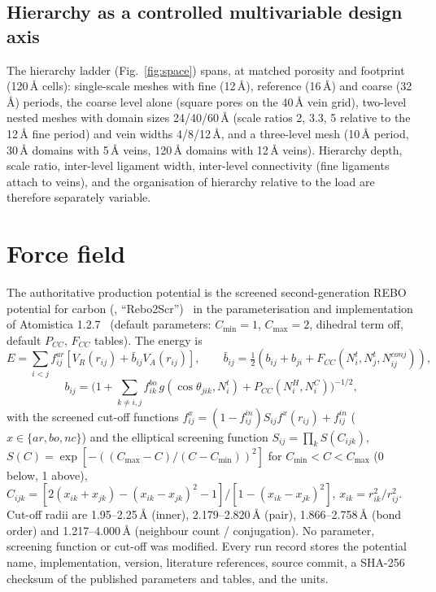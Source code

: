 \subsection{Hierarchy as a controlled multivariable design axis}
The hierarchy ladder (Fig.~\ref{fig:space}) spans, at matched porosity and footprint (120\,\AA{} cells): single-scale meshes with fine (12\,\AA), reference (16\,\AA) and coarse (32\,\AA) periods, the coarse level alone (square pores on the 40\,\AA{} vein grid), two-level nested meshes with domain sizes 24/40/60\,\AA{} (scale ratios 2, 3.3, 5 relative to the 12\,\AA{} fine period) and vein widths 4/8/12\,\AA, and a three-level mesh (10\,\AA{} period, 30\,\AA{} domains with 5\,\AA{} veins, 120\,\AA{} domains with 12\,\AA{} veins). Hierarchy depth, scale ratio, inter-level ligament width, inter-level connectivity (fine ligaments attach to veins), and the organisation of hierarchy relative to the load are therefore separately variable.

\section{Force field}
\label{sec:ff}
The authoritative production potential is the screened second-generation REBO potential for carbon (\rebo{}, ``Rebo2Scr'')~\cite{brenner2002,pastewka2008,pastewka2013} in the parameterisation and implementation of Atomistica 1.2.7~\cite{atomistica} (default parameters: $C_\mathrm{min}=1$, $C_\mathrm{max}=2$, dihedral term off, default $P_{CC}$, $F_{CC}$ tables). The energy is
\begin{equation}
E=\sum_{i<j} f^{ar}_{ij}\left[V_R(r_{ij})+\bar b_{ij}V_A(r_{ij})\right],\qquad
\bar b_{ij}=\tfrac12\left(b_{ij}+b_{ji}+F_{CC}(N^t_i,N^t_j,N^{conj}_{ij})\right),
\end{equation}
\begin{equation}
b_{ij}=\Big(1+\sum_{k\neq i,j} f^{bo}_{ik}\,g(\cos\theta_{jik},N^t_i)+P_{CC}(N^H_i,N^C_i)\Big)^{-1/2},
\end{equation}
with the screened cut-off functions $f^{x}_{ij}=(1-f^{in}_{ij})S_{ij}f^{x}(r_{ij})+f^{in}_{ij}$ ($x\in\{ar,bo,nc\}$) and the elliptical screening function $S_{ij}=\prod_k S(C_{ijk})$, $S(C)=\exp[-((C_\mathrm{max}-C)/(C-C_\mathrm{min}))^2]$ for $C_\mathrm{min}<C<C_\mathrm{max}$ (0 below, 1 above), $C_{ijk}=[2(x_{ik}+x_{jk})-(x_{ik}-x_{jk})^2-1]/[1-(x_{ik}-x_{jk})^2]$, $x_{ik}=r_{ik}^2/r_{ij}^2$. Cut-off radii are 1.95--2.25\,\AA{} (inner), 2.179--2.820\,\AA{} (pair), 1.866--2.758\,\AA{} (bond order) and 1.217--4.000\,\AA{} (neighbour count / conjugation). No parameter, screening function or cut-off was modified. Every run record stores the potential name, implementation, version, literature references, source commit, a SHA-256 checksum of the published parameters and tables, and the units.

